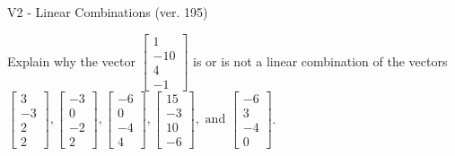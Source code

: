\begin{exercise}
  \begin{exerciseTitle}V2 - Linear Combinations (ver. 195)\end{exerciseTitle}
  \begin{exerciseStatement}
    Explain why the vector \(\left[\begin{array}{c}
1 \\
-10 \\
4 \\
-1
\end{array}\right]\)  is or is not a linear 
	combination of the vectors \(\left[\begin{array}{c}
3 \\
-3 \\
2 \\
2
\end{array}\right] , \left[\begin{array}{c}
-3 \\
0 \\
-2 \\
2
\end{array}\right] , \left[\begin{array}{c}
-6 \\
0 \\
-4 \\
4
\end{array}\right] , \left[\begin{array}{c}
15 \\
-3 \\
10 \\
-6
\end{array}\right] , \text{ and } \left[\begin{array}{c}
-6 \\
3 \\
-4 \\
0
\end{array}\right]\).
	



\end{exerciseStatement}
\end{exercise}
